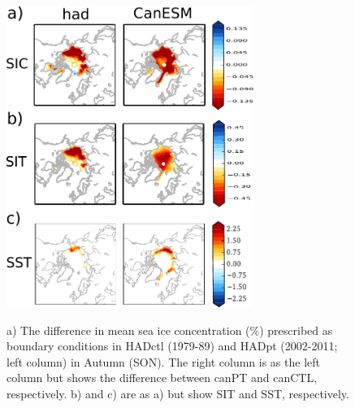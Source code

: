 \documentclass[twocol]{ametsoc}
\begin{document}
\begin{figure}[t]
  \noindent\includegraphics[width=19pc,angle=0]{oneseasBCsnonsidc.pdf}\\
  \caption{a) The difference in mean sea ice concentration (\%) prescribed as boundary conditions in HADctl (1979-89) and HADpt (2002-2011; left column) in Autumn (SON). The right column is as the left column but shows the difference between canPT and canCTL, respectively. b) and c) are as a) but show SIT and SST, respectively.
}\label{fig:fig1}
\end{figure}
\end{document}
